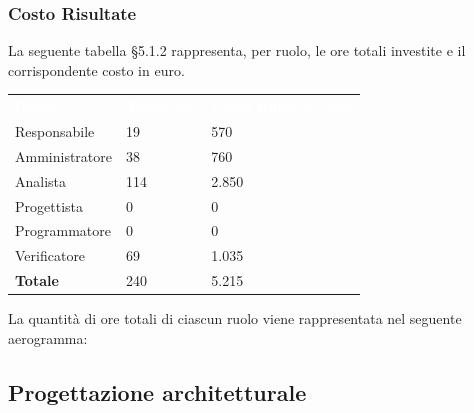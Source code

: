 \subsubsection{Costo Risultate}
La seguente tabella §5.1.2 rappresenta, per ruolo, le ore totali investite e il corrispondente costo in euro.
{
	\renewcommand{\arraystretch}{2}
	\centering
	\begin{longtable}{ C{3cm} C{2cm} C{4cm}}
		\textcolor{white}{\textbf{Ruolo}} & \textcolor{white}{\textbf{Totale ore}} & \textcolor{white}{\textbf{Costo Ruolo in euro}}\\	
        
        Responsabile & 19 & 570\\
        Amministratore & 38 & 760\\
        Analista & 114 & 2.850 \\
        Progettista & 0 & 0 \\
        Programmatore & 0 & 0 \\
        Verificatore & 69 & 1.035 \\
        \textbf{Totale} & 240 & 5.215 \\
		
	\end{longtable}
}

La quantità di ore totali di ciascun ruolo viene rappresentata nel seguente aerogramma:

\begin{figure}[h]
\end{figure}

\subsection{Progettazione architetturale}

